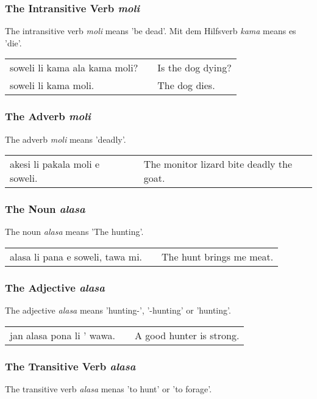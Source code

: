 \subsubsection*{The Intransitive Verb \textit{moli}}
The intransitive verb \textit{moli} means 'be dead'.
Mit dem Hilfsverb \textit{kama} means es 'die'.

\begin{supertabular}{p{5,5cm}|ll}
    soweli li kama ala kama moli? &  & Is the dog dying? \\
    soweli li kama moli.          &  & The dog dies.     \\
\end{supertabular}

\subsubsection*{The Adverb \textit{moli}}
The adverb \textit{moli} means 'deadly'.

\begin{supertabular}{p{5,5cm}|ll}
    akesi li pakala moli e soweli. &  & The monitor lizard bite deadly the goat. \\
\end{supertabular}

\subsubsection*{The Noun \textit{alasa}}
The noun \textit{alasa} means 'The hunting'.

\begin{supertabular}{p{5,5cm}|ll}
    alasa li pana e soweli, tawa mi. &  & The hunt brings me meat. \\
\end{supertabular}

\subsubsection*{The Adjective \textit{alasa}}
The adjective \textit{alasa} means 'hunting-', '-hunting' or 'hunting'.

\begin{supertabular}{p{5,5cm}|ll}
    jan alasa pona li ' wawa. &  & A good hunter is strong. \\
\end{supertabular}

\subsubsection*{The Transitive Verb \textit{alasa}}
The transitive verb \textit{alasa} menas 'to hunt' or 'to forage'.

